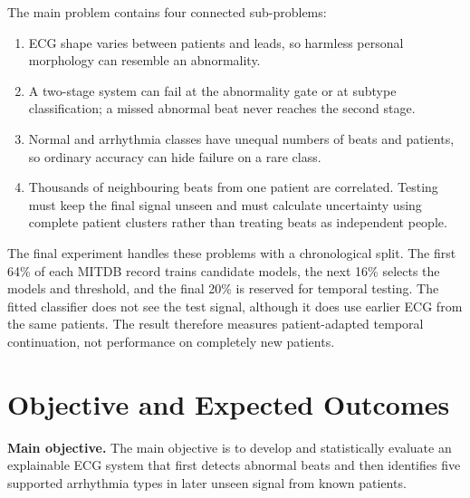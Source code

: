 The main problem contains four connected sub-problems:
\begin{enumerate}
    \item ECG shape varies between patients and leads, so harmless personal
    morphology can resemble an abnormality.
    \item A two-stage system can fail at the abnormality gate or at subtype
    classification; a missed abnormal beat never reaches the second stage.
    \item Normal and arrhythmia classes have unequal numbers of beats and
    patients, so ordinary accuracy can hide failure on a rare class.
    \item Thousands of neighbouring beats from one patient are correlated.
    Testing must keep the final signal unseen and must calculate uncertainty
    using complete patient clusters rather than treating beats as independent
    people.
\end{enumerate}

The final experiment handles these problems with a chronological split. The
first 64\% of each MITDB record trains candidate models, the next 16\% selects
the models and threshold, and the final 20\% is reserved for temporal testing.
The fitted classifier does not see the test signal, although it does use
earlier ECG from the same patients. The result therefore measures
patient-adapted temporal continuation, not performance on completely new
patients.

\section{Objective and Expected Outcomes}

\textbf{Main objective.}
The main objective is to develop and statistically evaluate an explainable ECG
system that first detects abnormal beats and then identifies five supported
arrhythmia types in later unseen signal from known patients.

